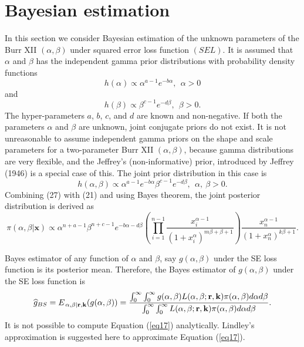 \documentclass[a4paper, 11pt]{article}
\numberwithin{equation}{section}
\begin{document}
\section{Bayesian  estimation}
In this section we consider Bayesian estimation of the unknown parameters of the Burr XII $(\alpha, \beta)$ under squared error loss function $(SEL)$. It is assumed that  $\alpha$  and $\beta$   has the independent gamma prior distributions with probability density functions
\begin{equation}
h(\alpha)\propto \alpha^{a-1}e^{-b\alpha},~~\alpha>0
\end{equation}
and
\begin{equation}
h(\beta)\propto \beta^{c-1}e^{-d\beta},~~\beta>0.
\end{equation}
The hyper-parameters $a$, $b$, $c$, and $d$ are known and non-negative. If both the parameters $\alpha$  and $\beta$  are unknown, joint conjugate priors do not exist. It is not unreasonable to assume independent gamma priors on the shape and scale parameters for a two-parameter  Burr XII $(\alpha, \beta)$, because gamma distributions are very flexible, and the Jeffrey's (non-informative) prior, introduced by Jeffrey (1946) is a special case of this. The joint prior distribution in this case is
\begin{equation}
h(\alpha, \beta)\propto \alpha^{a-1} e^{-b\alpha} \beta^{c-1} e^{-d\beta},~~\alpha,~\beta>0.
\end{equation}
Combining (27) with  (21) and using Bayes theorem, the joint posterior distribution is derived as
\begin{equation}
\pi(\alpha, \beta|\mathbf{x})\propto\alpha^{n+a-1} \beta^{n+c-1}e^{-b\alpha-d\beta}\left(\prod_{i=1}^{n-1}\frac{x_{i}^{\alpha-1}}{(1+x_{i}^{\alpha})^{m\beta+\beta+1}}\right)\frac{x_{n}^{\alpha-1}}{(1+x_{n}^{\alpha})^{k\beta+1}}.
\label{joint_post}
\end{equation}

 Bayes estimator of any function of $\alpha $ and $\beta $, say $g(\alpha
,\beta )$ under the SE loss function is its posterior mean. Therefore, the
Bayes estimator of $g(\alpha ,\beta )$ under the SE loss function is%
\begin{equation}
\widehat{g}_{BS}=E_{\left. \alpha ,\beta \right\vert \mathbf{r,k}}(g(\alpha
,\beta ))=\frac{\int_{0}^{\infty }\int_{0}^{\infty }g(\alpha ,\beta
)L(\alpha ,\beta ;\mathbf{r,k})\pi (\alpha ,\beta )d\alpha d\beta }{%
\int_{0}^{\infty }\int_{0}^{\infty }L(\alpha ,\beta ;\mathbf{r,k})\pi
(\alpha ,\beta )d\alpha d\beta }.  \label{eq17}
\end{equation}%
It is not possible to compute Equation (\ref{eq17}) analytically. Lindley's approximation is suggested here to approximate Equation (\ref{eq17}).
\end{document}

